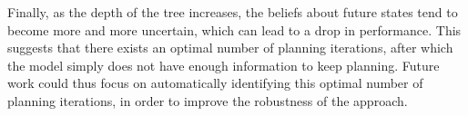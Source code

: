 \documentclass[twoside,11pt]{article}
\begin{document}
Finally, as the depth of the tree increases, the beliefs about future states tend to become more and more uncertain, which can lead to a drop in performance. This suggests that there exists an optimal number of planning iterations, after which the model simply does not have enough information to keep planning. Future work could thus focus on automatically identifying this optimal number of planning iterations, in order to improve the robustness of the approach.


\vskip 0.2in

\end{document}
